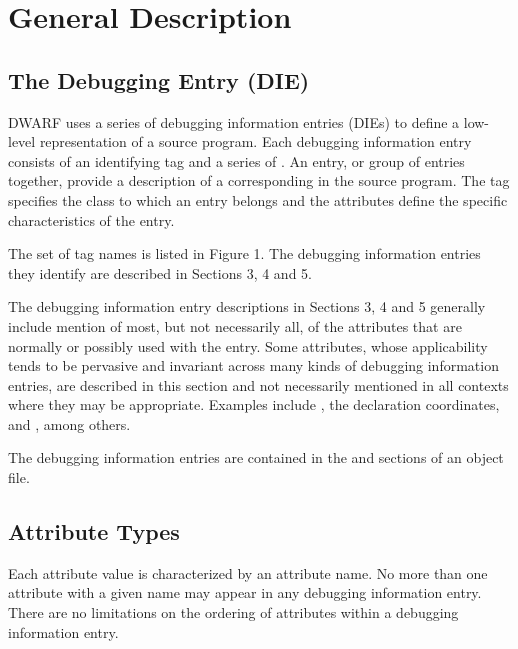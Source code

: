\chapter{General Description}
\label{chap:generaldescription}
\section{The Debugging Entry (DIE)}
\label{chap:thedebuggingentrydie}
DWARF 
uses 
a series of debugging information entries (DIEs) to 
define a low-level
representation of a source program. 
Each debugging information entry consists of an identifying
tag and a series of 
. 
An entry, or group of entries together, provide a description of a
corresponding 
 in the source program. 
The tag specifies the class to which an entry belongs
and the attributes define the specific characteristics of the entry.

The set of tag names is listed in Figure 1. 
The debugging information entries they identify are
described in Sections 3, 4 and 5.

The debugging information entry descriptions 
in Sections 3, 4 and 5 generally include mention of
most, but not necessarily all, of the attributes 
that are normally or possibly used with the entry.
Some attributes, whose applicability tends to be 
pervasive and invariant across many kinds of
debugging information entries, are described in 
this section and not necessarily mentioned in all
contexts where they may be appropriate. 
Examples include , the declaration
coordinates, and 
, among others.

The debugging information entries are contained 
in the  and 
sections of an object file.


\section{Attribute Types}
\label{chap:attributetypes}
Each attribute value is characterized by an attribute name. 
No more than one attribute with a given name may appear in any
debugging information entry. 
There are no limitations on the
ordering of attributes within a debugging information entry.

